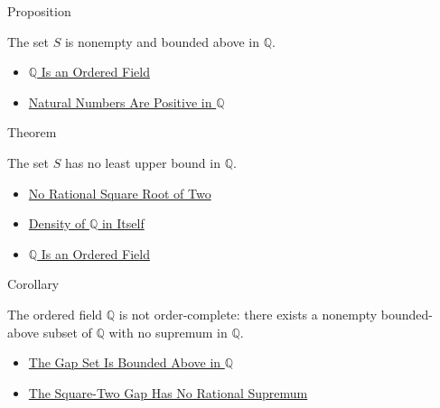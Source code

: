 \begin{propositionbox}{Proposition}
\begin{proposition}
\label{prop:gap-set-bounded-above-q}
The set $S$ is nonempty and bounded above in $\mathbb{Q}$.
\end{proposition}
\end{propositionbox}

\begin{dependencies}
\begin{itemize}
  \item \hyperref[thm:q-is-an-ordered-field]{$\mathbb{Q}$ Is an Ordered Field}
  \item \hyperref[cor:natural-numbers-positive-on-q]{Natural Numbers Are Positive in $\mathbb{Q}$}
\end{itemize}
\end{dependencies}

\begin{theorembox}{Theorem}
\begin{theorem}
\label{thm:gap-set-no-rational-supremum-q}
The set $S$ has no least upper bound in $\mathbb{Q}$.
\end{theorem}
\end{theorembox}

\begin{dependencies}
\begin{itemize}
  \item \hyperref[thm:no-rational-square-root-of-two]{No Rational Square Root of Two}
  \item \hyperref[thm:density-of-q]{Density of $\mathbb{Q}$ in Itself}
  \item \hyperref[thm:q-is-an-ordered-field]{$\mathbb{Q}$ Is an Ordered Field}
\end{itemize}
\end{dependencies}

\begin{corollarybox}{Corollary}
\begin{corollary}
\label{cor:q-order-incomplete}
The ordered field $\mathbb{Q}$ is not order-complete: there exists a nonempty
bounded-above subset of $\mathbb{Q}$ with no supremum in $\mathbb{Q}$.
\end{corollary}
\end{corollarybox}

\begin{dependencies}
\begin{itemize}
  \item \hyperref[prop:gap-set-bounded-above-q]{The Gap Set Is Bounded Above in $\mathbb{Q}$}
  \item \hyperref[thm:gap-set-no-rational-supremum-q]{The Square-Two Gap Has No Rational Supremum}
\end{itemize}
\end{dependencies}

